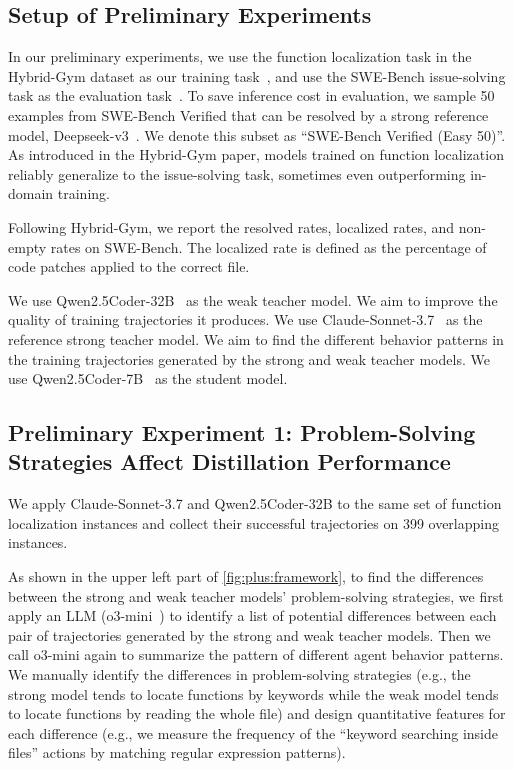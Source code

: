 \subsection{Setup of Preliminary Experiments}
In our preliminary experiments, we use the function localization task in the Hybrid-Gym dataset as our training task~\cite{hybrid-gym}, and use the SWE-Bench issue-solving task as the evaluation task~\cite{swebench}.
To save inference cost in evaluation, we sample 50 examples from SWE-Bench Verified that can be resolved by a strong reference model,  Deepseek-v3~\cite{deepseekv3}. We denote this subset as ``SWE-Bench Verified (Easy 50)''. 
As introduced in the Hybrid-Gym paper, models trained on function localization reliably generalize to the issue-solving task, sometimes even outperforming in-domain training.

Following Hybrid-Gym, we report the resolved rates, localized rates, and non-empty rates on SWE-Bench. The localized rate is defined as the percentage of code patches applied to the correct file.

We use Qwen2.5Coder-32B~\cite{qwen25coder} as the weak teacher model. We aim to improve the quality of training trajectories it produces.
We use Claude-Sonnet-3.7~\cite{claude37} as the reference strong teacher model. We aim to find the different behavior patterns in the training trajectories generated by the strong and weak teacher models.
We use Qwen2.5Coder-7B~\cite{qwen25coder} as the student model.





\subsection{Preliminary Experiment 1: Problem-Solving Strategies Affect Distillation Performance}
We apply Claude-Sonnet-3.7 and Qwen2.5Coder-32B to the same set of function localization instances and collect their successful trajectories on 399 overlapping instances.

As shown in the upper left part of \autoref{fig:plus:framework}, to find the differences between the strong and weak teacher models' problem-solving strategies, we first apply an LLM (o3-mini~\cite{o3_mini}) to identify a list of potential differences between each pair of trajectories generated by the strong and weak teacher models. Then we call o3-mini again to summarize the pattern of different agent behavior patterns.
We manually identify the differences in problem-solving strategies (e.g., the strong model tends to locate functions by keywords while the weak model tends to locate functions by reading the whole file) and design quantitative features for each difference (e.g., we measure the frequency of the ``keyword searching inside files'' actions by matching regular expression patterns).

